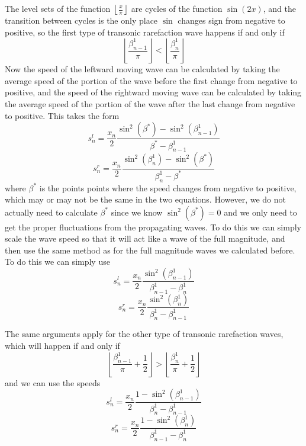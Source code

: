 \documentclass[12pt]{article}
\begin{document}
The level sets of the function $\left\lfloor \frac{x}{\pi} \right\rfloor$ are cycles of the function
$\sin(2x)$, and the transition between cycles is the only place $\sin$ changes sign from negative to
positive, so the first type of transonic rarefaction wave happens if and only if
\[ \left\lfloor \frac{\beta_{n-1}^1}{\pi} \right\rfloor < \left\lfloor \frac{\beta_n^1}{\pi}
\right\rfloor \]
Now the speed of the leftward moving wave can be calculated by taking the average speed of the
portion of the wave before the first change from negative to positive, and the speed of the
rightward moving wave can be calculated by taking the average speed of the portion of the wave after
the last change from negative to positive. This takes the form
\[ s^l_n = \frac{x_n}{2} \frac{\sin^2(\beta^*) - \sin^2(\beta_{n-1}^1)}{\beta^* - \beta_{n-1}^1} \]
\[ s^r_n = \frac{x_n}{2} \frac{\sin^2(\beta_n^1) - \sin^2(\beta^*)}{\beta_n^1 - \beta^*} \]
where $\beta^*$ is the points points where the speed changes from negative to positive, which may or
may not be the same in the two equations. However, we do not actually need to calculate $\beta^*$
since we know $\sin^2(\beta^*)=0$ and we only need to get the proper fluctuations from the
propagating waves. To do this we can simply scale the wave speed so that it will act like a wave of
the full magnitude, and then use the same method as for the full magnitude waves we calculated
before. To do this we can simply use
\[ s^l_n = \frac{x_n}{2} \frac{\sin^2(\beta_{n-1}^1)}{\beta_{n-1}^1 - \beta_n^1} \]
\[ s^r_n = \frac{x_n}{2} \frac{\sin^2(\beta_n^1)}{\beta_n^1 - \beta_{n-1}^1} \]

The same arguments apply for the other type of transonic rarefaction waves, which will happen if and
only if
\[ \left\lfloor \frac{\beta_{n-1}^1}{\pi} + \frac{1}{2} \right\rfloor > \left\lfloor
\frac{\beta_n^1}{\pi} + \frac{1}{2} \right\rfloor \]
and we can use the speeds
\[ s^l_n = \frac{x_n}{2} \frac{1 - \sin^2(\beta_{n-1}^1)}{\beta_n^1 - \beta_{n-1}^1} \]
\[ s^r_n = \frac{x_n}{2} \frac{1 - \sin^2(\beta_n^1)}{\beta_{n-1}^1 - \beta_n^1} \]
\end{document}
